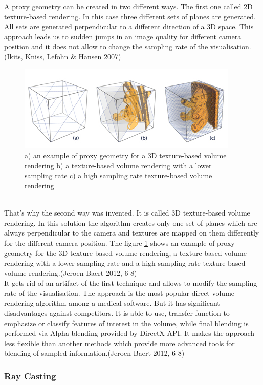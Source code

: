 \documentclass[twoside, english, 11pt]{report}
\begin{document}
A proxy geometry can be created in two different ways. The first one called 2D texture-based rendering. In this case three different sets of planes are generated. All sets are generated perpendicular to a different direction of a 3D space. This approach leads us to sudden jumps in an image quality for different camera position and it does not allow to change the sampling rate of the visualisation.(Ikits, Kniss, Lefohn \& Hansen 2007)\\
\begin{figure}[!h]
\centerline{
\includegraphics[scale=0.75]{img/texture-based}
}
\caption{a) an example of proxy geometry for a 3D texture-based volume rendering b) a texture-based volume rendering with a lower sampling rate c) a high sampling rate texture-based volume rendering\label{fig:text}}
\end{figure}
\\
That's why the second way was invented. It is called 3D texture-based volume rendering. In this solution the algorithm creates only one set of planes which are always perpendicular to the camera and textures are mapped on them differently for the different camera position. The figure \ref{fig:text} shows an example of proxy geometry for the 3D texture-based volume rendering, a texture-based volume rendering with a lower sampling rate and a high sampling rate texture-based volume rendering.(Jeroen Baert 2012, 6-8)\\

It gets rid of an artifact of the first technique and allows to modify the sampling rate of the visualisation. The approach is the most popular direct volume rendering algorithm among a medical software. But it has significant disadvantages against competitors. It is able to use, transfer function to emphasize or classify features of interest in the volume, while final blending is performed via Alpha-blending provided by DirectX API. It makes the approach less flexible than another methods which provide more advanced tools for blending of sampled information.(Jeroen Baert 2012, 6-8)

\subsubsection{Ray Casting}
\end{document}
